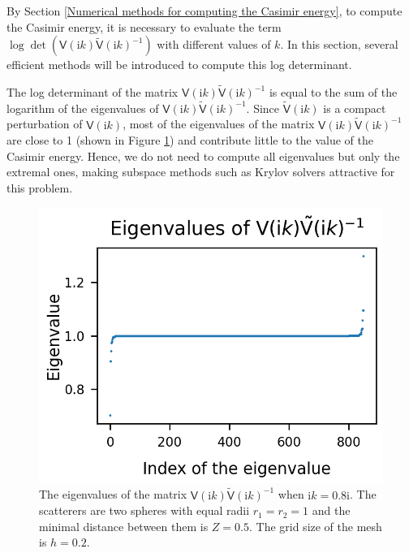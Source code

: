 By Section \ref{Numerical methods for computing the Casimir energy}, to compute the Casimir energy, it is necessary to evaluate the term
$\log\det(\mathsf{V}(\mathrm{i}k)\tilde{\mathsf{V}}(\mathrm{i}k)^{-1})$ 
with different values of $k$. In this section, several efficient methods will be introduced to compute this log determinant.

The log determinant of the matrix $\mathsf{V}(\mathrm{i}k)\tilde{\mathsf{V}}(\mathrm{i}k)^{-1}$ is equal to the sum of the logarithm of the eigenvalues of 
$\mathsf{V}(\mathrm{i}k)\tilde{\mathsf{V}}(\mathrm{i}k)^{-1}$. Since $\tilde{\mathsf{V}}(\mathrm{i}k)$ is a compact perturbation of $\mathsf{V}(\mathrm{i}k)$,
most of the eigenvalues of the matrix $\mathsf{V}(\mathrm{i}k)\tilde{\mathsf{V}}(\mathrm{i}k)^{-1}$ are close to 1 
(shown in Figure \ref{eigenvalues of VVtilde}) and contribute little to the value of the Casimir energy. Hence, we do not need to compute all eigenvalues but only
the extremal ones, making subspace methods such as Krylov solvers attractive for this problem.

\begin{figure}[H]
    \centering
    \includegraphics[scale = 0.5]{figures/Scalar_eigenvalues_around_1.png}
    \caption{The eigenvalues of the matrix $\mathsf{V}(\mathrm{i}k)\tilde{\mathsf{V}}(\mathrm{i}k)^{-1}$ when $\mathrm{i}k = 0.8\mathrm{i}$.
    The scatterers are two spheres with equal radii $r_{1} = r_{2} = 1$ and the minimal distance between them is $Z = 0.5$. The grid size of the mesh is $h = 0.2$.}
    \label{eigenvalues of VVtilde}
\end{figure}

